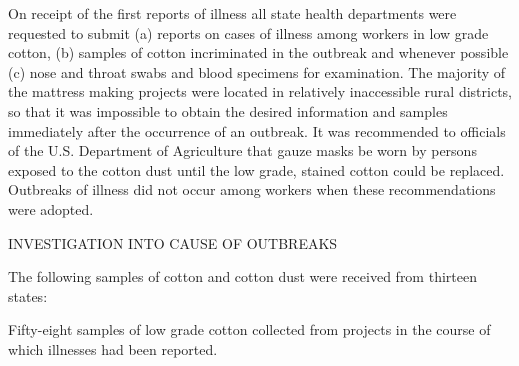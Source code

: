 \documentclass[10pt, letterpaper]{memoir}
\begin{document}
\begin{multicols}{2}
On receipt of the first reports of illness all state health departments were requested to submit (a) reports on cases of illness among workers in low grade cotton, (b) samples of cotton incriminated in the outbreak and whenever possible (c) nose and throat swabs and blood specimens for examination. The majority of the mattress making projects were located in relatively inaccessible rural districts, so that it was impossible to obtain the desired information and samples immediately after the occurrence of an outbreak. It was recommended to officials of the U.S. Department of Agriculture that gauze masks be worn by persons exposed to the cotton dust until the low grade, stained cotton could be replaced. Outbreaks of illness did not occur among workers when these recommendations were adopted.

\begin{center}
    INVESTIGATION INTO CAUSE OF OUTBREAKS
\end{center}

The following samples of cotton and cotton dust
were received from thirteen states:

Fifty-eight samples of low grade cotton collected from
projects in the course of which illnesses had been reported.

\end{multicols}
\end{document}
